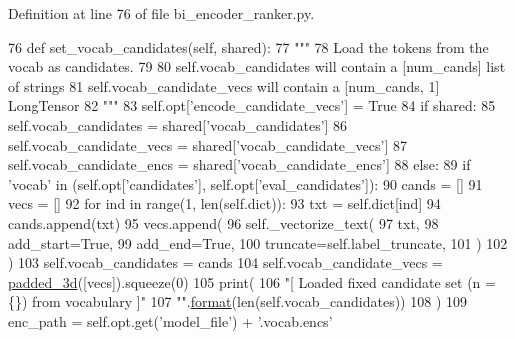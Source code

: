 Definition at line 76 of file bi\+\_\+encoder\+\_\+ranker.\+py.


\begin{DoxyCode}
76     \textcolor{keyword}{def }set\_vocab\_candidates(self, shared):
77         \textcolor{stringliteral}{"""}
78 \textcolor{stringliteral}{        Load the tokens from the vocab as candidates.}
79 \textcolor{stringliteral}{}
80 \textcolor{stringliteral}{        self.vocab\_candidates will contain a [num\_cands] list of strings}
81 \textcolor{stringliteral}{        self.vocab\_candidate\_vecs will contain a [num\_cands, 1] LongTensor}
82 \textcolor{stringliteral}{        """}
83         self.opt[\textcolor{stringliteral}{'encode\_candidate\_vecs'}] = \textcolor{keyword}{True}
84         \textcolor{keywordflow}{if} shared:
85             self.vocab\_candidates = shared[\textcolor{stringliteral}{'vocab\_candidates'}]
86             self.vocab\_candidate\_vecs = shared[\textcolor{stringliteral}{'vocab\_candidate\_vecs'}]
87             self.vocab\_candidate\_encs = shared[\textcolor{stringliteral}{'vocab\_candidate\_encs'}]
88         \textcolor{keywordflow}{else}:
89             \textcolor{keywordflow}{if} \textcolor{stringliteral}{'vocab'} \textcolor{keywordflow}{in} (self.opt[\textcolor{stringliteral}{'candidates'}], self.opt[\textcolor{stringliteral}{'eval\_candidates'}]):
90                 cands = []
91                 vecs = []
92                 \textcolor{keywordflow}{for} ind \textcolor{keywordflow}{in} range(1, len(self.dict)):
93                     txt = self.dict[ind]
94                     cands.append(txt)
95                     vecs.append(
96                         self.\_vectorize\_text(
97                             txt,
98                             add\_start=\textcolor{keyword}{True},
99                             add\_end=\textcolor{keyword}{True},
100                             truncate=self.label\_truncate,
101                         )
102                     )
103                 self.vocab\_candidates = cands
104                 self.vocab\_candidate\_vecs = \hyperlink{namespaceparlai_1_1utils_1_1torch_a1494906187c1ba19f92defb0d4c19ffe}{padded\_3d}([vecs]).squeeze(0)
105                 print(
106                     \textcolor{stringliteral}{"[ Loaded fixed candidate set (n = \{\}) from vocabulary ]"}
107                     \textcolor{stringliteral}{""}.\hyperlink{namespaceparlai_1_1chat__service_1_1services_1_1messenger_1_1shared__utils_a32e2e2022b824fbaf80c747160b52a76}{format}(len(self.vocab\_candidates))
108                 )
109                 enc\_path = self.opt.get(\textcolor{stringliteral}{'model\_file'}) + \textcolor{stringliteral}{'.vocab.encs'}

\end{DoxyCode}
